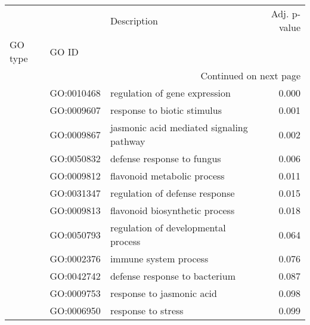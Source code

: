 \begin{longtable}{lllr}
\toprule
   &            &                               Description &  Adj. p-value \\
GO type & GO ID &                                           &               \\
\midrule
\endhead
\midrule
\multicolumn{4}{r}{{Continued on next page}} \\
\midrule
\endfoot

\bottomrule
\endlastfoot
\multirow{12}{*}{BP} & GO:0010468 &             regulation of gene expression &         0.000 \\
   & GO:0009607 &               response to biotic stimulus &         0.001 \\
   & GO:0009867 &  jasmonic acid mediated signaling pathway &         0.002 \\
   & GO:0050832 &                defense response to fungus &         0.006 \\
   & GO:0009812 &               flavonoid metabolic process &         0.011 \\
   & GO:0031347 &            regulation of defense response &         0.015 \\
   & GO:0009813 &            flavonoid biosynthetic process &         0.018 \\
   & GO:0050793 &       regulation of developmental process &         0.064 \\
   & GO:0002376 &                     immune system process &         0.076 \\
   & GO:0042742 &             defense response to bacterium &         0.087 \\
   & GO:0009753 &                 response to jasmonic acid &         0.098 \\
   & GO:0006950 &                        response to stress &         0.099 \\
\end{longtable}
